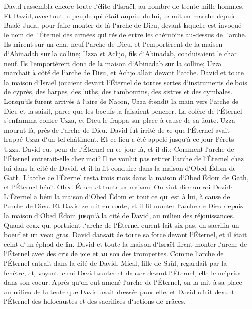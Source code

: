 \verse David rassembla encore toute l`élite d`Israël, au nombre de trente mille hommes. 
\verse Et David, avec tout le peuple qui était auprès de lui, se mit en marche depuis Baalé Juda, pour faire monter de là l`arche de Dieu, devant laquelle est invoqué le nom de l`Éternel des armées qui réside entre les chérubins au-dessus de l`arche. 
\verse Ils mirent sur un char neuf l`arche de Dieu, et l`emportèrent de la maison d`Abinadab sur la colline; Uzza et Achjo, fils d`Abinadab, conduisaient le char neuf. 
\verse Ils l`emportèrent donc de la maison d`Abinadab sur la colline; Uzza marchait à côté de l`arche de Dieu, et Achjo allait devant l`arche. 
\verse David et toute la maison d`Israël jouaient devant l`Éternel de toutes sortes d`instruments de bois de cyprès, des harpes, des luths, des tambourins, des sistres et des cymbales. 
\verse Lorsqu`ils furent arrivés à l`aire de Nacon, Uzza étendit la main vers l`arche de Dieu et la saisit, parce que les boeufs la faisaient pencher. 
\verse La colère de l`Éternel s`enflamma contre Uzza, et Dieu le frappa sur place à cause de sa faute. Uzza mourut là, près de l`arche de Dieu. 
\verse David fut irrité de ce que l`Éternel avait frappé Uzza d`un tel châtiment. Et ce lieu a été appelé jusqu`à ce jour Pérets Uzza. 
\verse David eut peur de l`Éternel en ce jour-là, et il dit: Comment l`arche de l`Éternel entrerait-elle chez moi? 
\verse Il ne voulut pas retirer l`arche de l`Éternel chez lui dans la cité de David, et il la fit conduire dans la maison d`Obed Édom de Gath. 
\verse L`arche de l`Éternel resta trois mois dans la maison d`Obed Édom de Gath, et l`Éternel bénit Obed Édom et toute sa maison. 
\verse On vint dire au roi David: L`Éternel a béni la maison d`Obed Édom et tout ce qui est à lui, à cause de l`arche de Dieu. Et David se mit en route, et il fit monter l`arche de Dieu depuis la maison d`Obed Édom jusqu`à la cité de David, au milieu des réjouissances. 
\verse Quand ceux qui portaient l`arche de l`Éternel eurent fait six pas, on sacrifia un boeuf et un veau gras. 
\verse David dansait de toute sa force devant l`Éternel, et il était ceint d`un éphod de lin. 
\verse David et toute la maison d`Israël firent monter l`arche de l`Éternel avec des cris de joie et au son des trompettes. 
\verse Comme l`arche de l`Éternel entrait dans la cité de David, Mical, fille de Saül, regardait par la fenêtre, et, voyant le roi David sauter et danser devant l`Éternel, elle le méprisa dans son coeur. 
\verse Après qu`on eut amené l`arche de l`Éternel, on la mit à sa place au milieu de la tente que David avait dressée pour elle; et David offrit devant l`Éternel des holocaustes et des sacrifices d`actions de grâces. 
